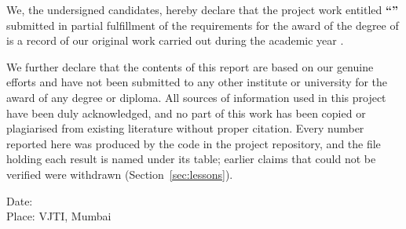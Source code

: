 We, the undersigned candidates, hereby declare that the project work entitled \textbf{``\reporttitle''}
submitted in partial fulfillment of the requirements for the award of the degree of \degree{} is a
record of our original work carried out during the academic year \academicyear.

We further declare that the contents of this report are based on our genuine efforts and have not
been submitted to any other institute or university for the award of any degree or diploma. All
sources of information used in this project have been duly acknowledged, and no part of this work has
been copied or plagiarised from existing literature without proper citation. Every number reported
here was produced by the code in the project repository, and the file holding each result is named
under its table; earlier claims that could not be verified were withdrawn
(Section~\ref{sec:lessons}).

\vspace{1cm}


\vspace{2cm}
\noindent Date: \submissiondate\\
Place: VJTI, Mumbai
